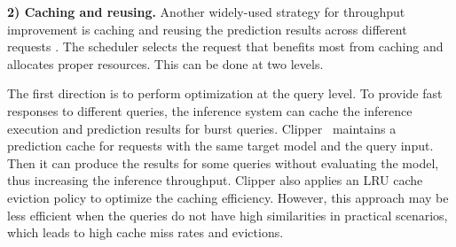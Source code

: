 \textbf{2) Caching and reusing. } Another widely-used strategy for throughput improvement is caching and reusing the prediction results across different requests {\tiny{}}.
The scheduler selects the request that benefits most from caching and allocates proper resources. This can be done at two levels.

The first direction is to perform optimization at the query level. To provide fast responses to different queries, the inference system can cache the inference execution and prediction results for burst queries. Clipper~\cite{Daniel2017clipper} maintains a prediction cache for requests with the same target model and the query input. Then it can produce the results for some queries without evaluating the model, thus increasing the inference throughput. Clipper also applies an LRU cache eviction policy to optimize the caching efficiency. However, this approach may be less efficient when the queries do not have high similarities in practical scenarios, which leads to high cache miss rates and evictions.


